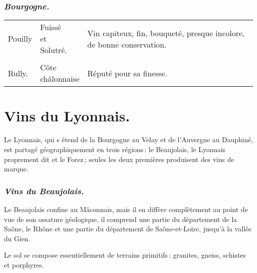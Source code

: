 \subsubsection*{\centering \textit{Bourgogne.}}

\scriptsize
\begin{longtable}{m{12em}m{9em}m{13em}}                                                    
  Pouilly                         & \makecell{Fuissé 
                                    \\ et        
                                    \\ Solutré.}        & Vin capiteux, fin, bouqueté, presque incolore, 
                                                              de bonne conservation.                                   \\
                                  &                     &                                                              \\
  Rully.                          & \makecell{Côte     
                                     \\ châlonnaise}    & Réputé pour sa finesse.                                      \\
\end{longtable}                                                                                             
\normalsize

\section*{\centering Vins du Lyonnais.}

Le Lyonnais, qui s étend de la Bourgogne au Velay et de l'Auvergne au Dauphiné,
est partagé géographiquement en trois régions : le Beaujolais, le Lyonnais
proprement dit et le Forez ; seules les deux premières produisent des vins de
marque.

\subsubsection*{\centering \textit{ Vins du Beaujolais.}}

Le Beaujolais confine au Mâconnais, mais il en diffère complètement au point de
vue de son ossature géologique, il comprend une partie du département de la
Saône, le Rhône et une partie du département de Saône-et-Loire, jusqu'à la
vallée du Gien.

Le sol se compose essentiellement de terrains primitifs : granites, gneiss,
schistes et porphyres.

